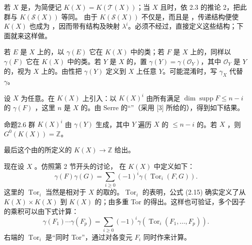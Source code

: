 若 $X$ 是，为简便记 $K(X)=K(\mathscr T(X))$；当 $X$ 且时，依 2.3 的推论 2，把此群与 $K(\mathscr S(X))$ 等同。
由于 $K(\mathscr S(X))$ 不仅是，而且是 ，传递结构便使 $K(X)$ 也成为 ，因而带有结构及映射 $\lambda^i$。必须不经过，直接定义这些结构；下面就来这样做。

若 $E$ 是 $X$ 上的，以 $\gamma(E)$ 它在 $K(X)$ 中的类；若 $F$ 是 $X$ 上的，同样以 $\gamma(F)$ 它在 $K(X)$ 中的类。若 $Y$ 是 $X$ 的，置 $\gamma(Y)=\gamma(\mathcal O_Y)$，其中 $\mathcal O_Y$ 是 $Y$ 的，视为 $X$ 上的。由性把 $\gamma(Y)$ 定义到 $X$ 上任意 $Y$。可能混淆时，写 $\gamma_X$ 代替 $\gamma$。

设 $X$ 为任意。在 $K(X)$ 上引入：以 $K(X)^i$ 由所有满足 $\dim\operatorname{supp}F\leq n-i$ 的 $\gamma(F)$ ，这里 $n$ 是 $X$ 的。由 Serre 的“”（采用 [3] 所给的），得到如下结果。
\begin{SGAresult}{命题}{2.6}
群 $K(X)^i$ 由 $\gamma(Y)$ 生成，其中 $Y$ 遍历 $X$ 的 $\leq n-i$ 的。若 $X$ ，则 $G^0(K(X))=\mathbb Z$。
\end{SGAresult}
最后这个由的所定义的 $K(X)\to\mathbb Z$ 给出。

现在设 $X$ 。仿照第 2 节开头的讨论，
在 $K(X)$ 中定义如下：
\[
\gamma(F)\gamma(G)=\sum_{i\geq0}(-1)^i\gamma(\operatorname{Tor}_i(F,G)).\tag{2.15}
\]
这里的 $\operatorname{Tor}_i$ 当然是相对于 $X$ 的取的。$\operatorname{Tor}_i$ 的表明，公式 (2.15) 确实定义了从 $K(X)\times K(X)$ 到 $K(X)$ 的；由多重 Tor 的得出。这样也可验证，多个因子的乘积可以由下式计算：
\[
\gamma(F_1)\cdots\gamma(F_p)=\sum_{i\geq0}(-1)^i\gamma(\operatorname{Tor}_i(F_1,\ldots,F_p)).\tag{2.16}
\]
右端的 $\operatorname{Tor}_i$ 是“同时 Tor”，通过对各变元 $F_i$ 同时作来计算。

